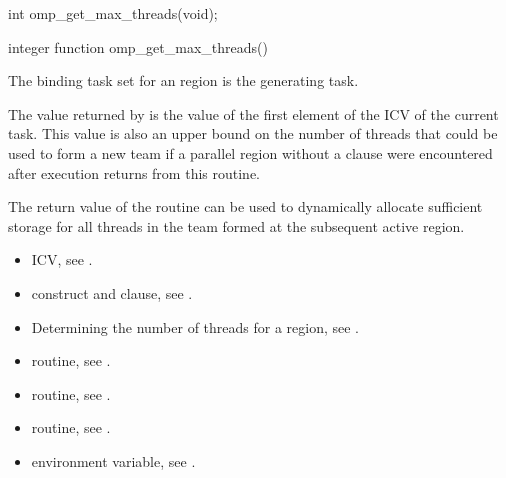\format
\begin{ccppspecific}
\begin{ompcFunction}
int omp_get_max_threads(void);
\end{ompcFunction}
\end{ccppspecific}

\begin{fortranspecific}
\begin{ompfFunction}
integer function omp_get_max_threads()
\end{ompfFunction}
\end{fortranspecific}

\binding
The binding task set for an  region is the generating task.

\effect
The value returned by  is the value of the first element of
the  ICV of the current task. This value is also an upper bound on the
number of threads that could be used to form a new team if a parallel region without a
 clause were encountered after execution returns from this routine.

\begin{note}
The return value of the  routine can be used to
dynamically allocate sufficient storage for all threads in the team formed at the
subsequent active  region.
\end{note}

\crossreferences
\begin{itemize}
\item {} ICV, see
.

\item {} construct and  clause, see
.

\item Determining the number of threads for a  region, see
.

\item {} routine, see
.

\item {} routine, see
.

\item {} routine, see
.

\item {} environment variable, see
.
\end{itemize}











